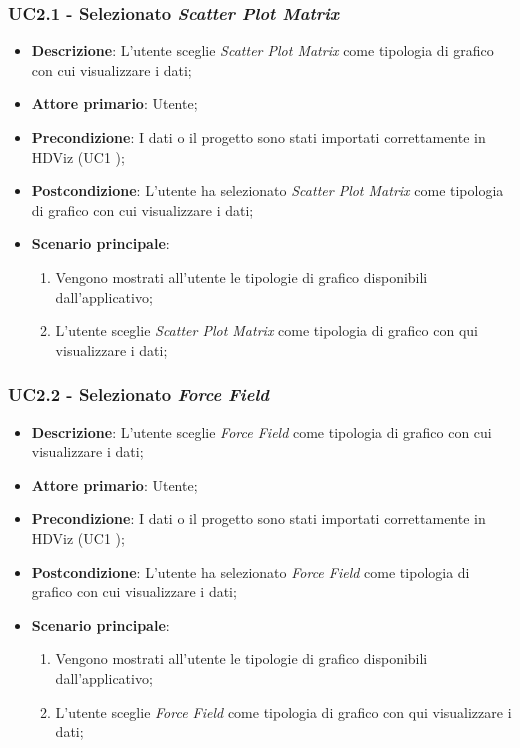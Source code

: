 \subsubsection{UC2.1 - Selezionato \emph{Scatter Plot Matrix}}
\label{ssub:uc2.1}

\begin{itemize}
	\item \textbf{Descrizione}: L'utente sceglie \emph{Scatter Plot Matrix} come tipologia di grafico con cui visualizzare i dati;
	\item \textbf{Attore primario}: Utente;
	\item \textbf{Precondizione}: I dati o il progetto sono stati importati correttamente in HDViz (UC1 );
	\item \textbf{Postcondizione}: L'utente ha selezionato \emph{Scatter Plot Matrix} come tipologia di grafico con cui visualizzare i dati;
	\item \textbf{Scenario principale}:
		\begin{enumerate}
			\item Vengono mostrati all'utente le tipologie di grafico disponibili dall'applicativo;
			\item L'utente sceglie \emph{Scatter Plot Matrix} come tipologia di grafico con qui visualizzare i dati;
		\end{enumerate}
\end{itemize}

\subsubsection{UC2.2 - Selezionato \emph{Force Field}}
\label{ssub:uc2.2}

\begin{itemize}
	\item \textbf{Descrizione}: L'utente sceglie \emph{Force Field} come tipologia di grafico con cui visualizzare i dati;
	\item \textbf{Attore primario}: Utente;
	\item \textbf{Precondizione}: I dati o il progetto sono stati importati correttamente in HDViz (UC1 );
	\item \textbf{Postcondizione}: L'utente ha selezionato \emph{Force Field} come tipologia di grafico con cui visualizzare i dati;
	\item \textbf{Scenario principale}:
		\begin{enumerate}
			\item Vengono mostrati all'utente le tipologie di grafico disponibili dall'applicativo;
			\item L'utente sceglie \emph{Force Field} come tipologia di grafico con qui visualizzare i dati;
		\end{enumerate}
\end{itemize}

